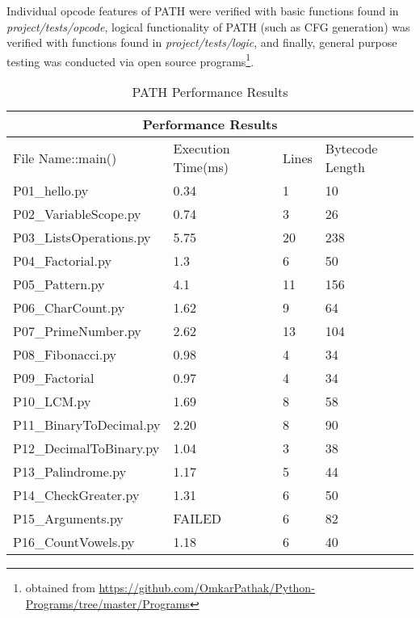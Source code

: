     \par Individual opcode features of \acs{PATH} were verified with basic functions found in \textit{project/tests/opcode}, logical functionality of \acs{PATH} (such as \acs{CFG} generation) was verified with 
    functions found in \textit{project/tests/logic}, and finally, general purpose testing was conducted via open source programs\footnote{obtained from \url{https://github.com/OmkarPathak/Python-Programs/tree/master/Programs}}.

    \tiny
    \begin{longtable}{|p{5cm}|p{3.5cm}|p{1cm}|p{3cm}|}
        \caption{\acs{PATH} Performance Results}
        \label{table:resultsPATH}
        \endfirsthead
        \endhead
        \hline
        \multicolumn{4}{|c|}{{\bfseries Performance Results}} \\
        \hline
        File Name::main() & Execution Time(ms) & Lines &Bytecode Length\\
        \hhline{|====|}
        P01\_hello.py & 0.34 & 1  & 10\\
        \hline
        P02\_VariableScope.py & 0.74 & 3 & 26\\
        \hline
        P03\_ListsOperations.py & 5.75 & 20 & 238\\
        \hline
        P04\_Factorial.py & 1.3 & 6 & 50\\
        \hline
        P05\_Pattern.py & 4.1 & 11 & 156\\
        \hline
        P06\_CharCount.py & 1.62 & 9 & 64\\
        \hline        
        P07\_PrimeNumber.py & 2.62 & 13 & 104\\
        \hline
        P08\_Fibonacci.py & 0.98 & 4 & 34\\ 
        \hline
        P09\_Factorial & 0.97 & 4 & 34\\
        \hline
        P10\_LCM.py & 1.69 & 8 & 58\\
        \hline
        P11\_BinaryToDecimal.py& 2.20 & 8 & 90\\
        \hline
        P12\_DecimalToBinary.py& 1.04 & 3 & 38\\
        \hline
        P13\_Palindrome.py& 1.17 & 5 & 44\\
        \hline
        P14\_CheckGreater.py& 1.31 & 6 & 50\\
        \hline
        P15\_Arguments.py& FAILED & 6 & 82\\ 
        \hline
        P16\_CountVowels.py& 1.18 & 6 & 40\\

\end{longtable}
